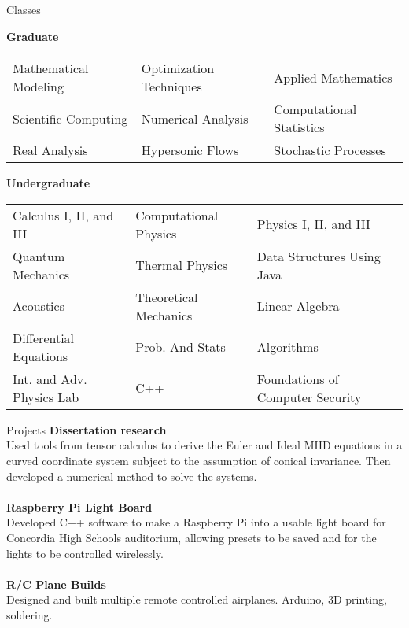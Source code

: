 \documentclass{resume} %
\begin{document}
\begin{rSection}{Classes}

{\bf Graduate}\\
\begin{tabular}{ m{15em} m{15em} m{15em} }
Mathematical Modeling & Optimization Techniques	& Applied Mathematics \\
Scientific Computing & Numerical Analysis & Computational Statistics \\
Real Analysis & Hypersonic Flows & Stochastic Processes\\
\end{tabular}

{\bf Undergraduate}\\
\begin{tabular}{ m{15em} m{15em} m{15em} }
Calculus I, II, and III & Computational Physics & Physics I, II, and III \\
Quantum Mechanics & Thermal Physics & Data Structures Using Java \\
Acoustics & Theoretical Mechanics & Linear Algebra \\
Differential Equations & Prob. And Stats & Algorithms \\
Int. and Adv. Physics Lab  & C++ & Foundations of Computer Security
\end{tabular}

\end{rSection}



\begin{rSection}{Projects}
{\bf Dissertation research}
\\Used tools from tensor calculus to derive the Euler and Ideal MHD equations in a curved coordinate system subject to the assumption of conical invariance. Then developed a numerical method to solve the systems. \\
\\{\bf Raspberry Pi Light Board}\\
Developed C++ software to make a Raspberry Pi into a usable light board for Concordia High School\textquotesingle s auditorium, allowing presets to be saved and for the lights to be controlled wirelessly.\\
\\{\bf R/C Plane Builds}\\
Designed and built multiple remote controlled airplanes. Arduino, 3D printing, soldering.



\end{rSection}
\end{document}
